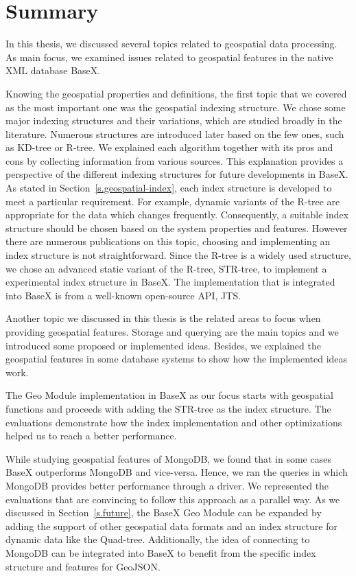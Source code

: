 \documentclass[a4paper,12pt]{article}
\begin{document}
\newpage
\section{Summary}
\label{sum}
In this thesis, we discussed several topics related to geospatial data processing. As main focus, we examined issues related to geospatial features in the native XML database BaseX. 

Knowing the geospatial properties and definitions, the first topic that we covered as the most important one was the geospatial indexing structure. We chose some major indexing structures and their variations, which are studied broadly in the literature. Numerous structures are introduced later based on the few ones, such as KD-tree or R-tree. We explained each algorithm together with its pros and cons by collecting information from various sources. This explanation provides a perspective of the different indexing structures for future developments in BaseX. As stated in Section~\ref{s.geospatial-index}, each index structure is developed to meet a particular requirement. For example, dynamic variants of the R-tree are appropriate for the data which changes frequently. Consequently, a suitable index structure should be chosen based on the system properties and features. However there are numerous publications on this topic, choosing and implementing an index structure is not straightforward. Since the R-tree is a widely used structure, we chose an advanced static variant of the R-tree, STR-tree, to implement a experimental index structure in BaseX. The implementation that is integrated into BaseX is from a well-known open-source API, JTS. 

Another topic we discussed in this thesis is the related areas to focus when providing geospatial features.
Storage and querying are the main topics and we introduced some proposed or implemented ideas. Besides, we explained the geospatial features in some database systems to show how the implemented ideas work.


The Geo Module implementation in BaseX as our focus starts with geospatial functions and proceeds with adding the STR-tree as the index structure. The evaluations demonstrate how the index implementation and other optimizations helped us to reach a better performance.


While studying geospatial features of MongoDB, we found that in some cases BaseX outperforms MongoDB and vice-versa. Hence, we ran the queries in which MongoDB provides better performance through a driver. We represented the evaluations that are convincing to follow this approach as a parallel way. 
As we discussed in Section~\ref{s.future}, the BaseX Geo Module can be expanded by adding the support of other geospatial data formats and an index structure for dynamic data like the Quad-tree. Additionally, the idea of connecting to MongoDB can be integrated into BaseX to benefit from the specific index structure and features for GeoJSON.



\newpage


\newpage
\listoffigures
\newpage
\listoftables
\newpage
\lstlistoflistings
\end{document}
